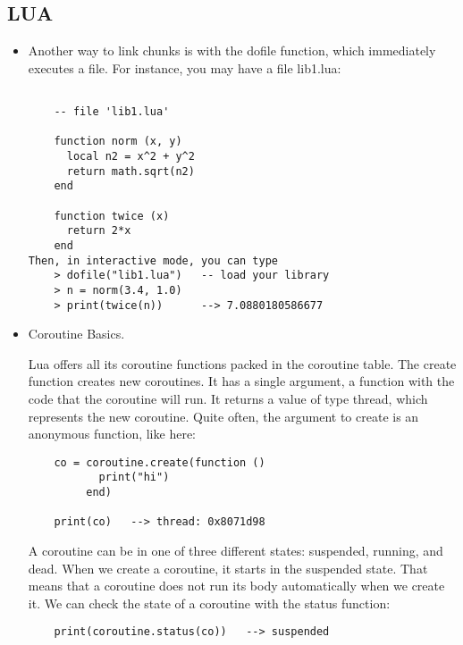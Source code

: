 \subsection{LUA}

\begingroup
\nocite{*}
\let\clearpage\relax
\printbibliography[heading=\bibheader,keyword={LUA},title={\textcolor{antiquefuchsia}{LUA refs}}]

\endgroup

\begin{itemize}

\item Another way to link chunks is with the dofile function, which immediately executes a file. For instance, you may have a file lib1.lua:


\begin{lstlisting}

    -- file 'lib1.lua'
    
    function norm (x, y)
      local n2 = x^2 + y^2
      return math.sqrt(n2)
    end
    
    function twice (x)
      return 2*x
    end
Then, in interactive mode, you can type
    > dofile("lib1.lua")   -- load your library
    > n = norm(3.4, 1.0)
    > print(twice(n))      --> 7.0880180586677

\end{lstlisting}

\item Coroutine Basics.

Lua offers all its coroutine functions packed in the coroutine table. The create function creates new coroutines. It has a single argument, a function with the code that the coroutine will run. It returns a value of type thread, which represents the new coroutine. Quite often, the argument to create is an anonymous function, like here:

\begin{lstlisting}
    co = coroutine.create(function ()
           print("hi")
         end)
    
    print(co)   --> thread: 0x8071d98
\end{lstlisting}

A coroutine can be in one of three different states: suspended, running, and dead. When we create a coroutine, it starts in the suspended state. That means that a coroutine does not run its body automatically when we create it. We can check the state of a coroutine with the status function:
\begin{lstlisting}
    print(coroutine.status(co))   --> suspended
\end{lstlisting}


\end{itemize}
